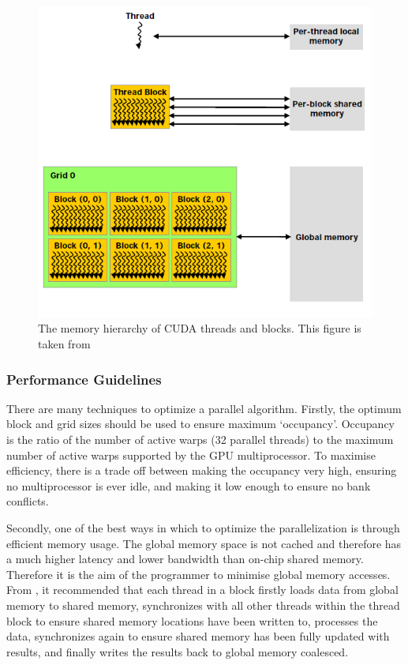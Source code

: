 \begin{figure}[p]
	\centering
		\includegraphics[scale=0.4]{images/cudamemory.PNG}
		\caption{The memory hierarchy of CUDA threads and blocks. This figure is taken from \cite{cuda}}
	\label{fig:cudamemory}
\end{figure}

		\subsubsection{Performance Guidelines}
There are many techniques to optimize a parallel algorithm. Firstly, the optimum block and grid sizes should be used to ensure maximum `occupancy'. Occupancy is the ratio of the number of active warps (32 parallel threads) to the maximum number of active warps supported by the GPU multiprocessor. To maximise efficiency, there is a trade off between making the occupancy very high, ensuring no multiprocessor is ever idle, and making it low enough to ensure no bank conflicts.

Secondly, one of the best ways in which to optimize the parallelization is through efficient memory usage. The global memory space is not cached and therefore has a much higher latency and lower bandwidth than on-chip shared memory. Therefore it is the aim of the programmer to minimise global memory accesses. From \cite{cuda}, it recommended that each thread in a block firstly loads data from global memory to shared memory, synchronizes with all other threads within the thread block to ensure shared memory locations have been written to, processes the data, synchronizes again to ensure shared memory has been fully updated with results, and finally writes the results back to global memory coalesced.

